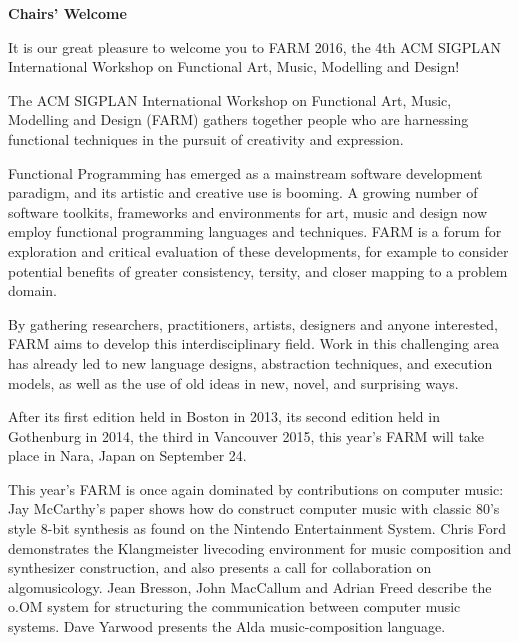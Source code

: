 \documentclass[letter]{sigplanconf}
\begin{document}
\onecolumn

\pagestyle{empty}
\begin{center}
{\bfseries \Huge Chairs' Welcome}
\end{center}

\bigskip
\bigskip


It is our great pleasure to welcome you to FARM 2016, the 4th ACM
SIGPLAN International Workshop on Functional Art, Music, Modelling and
Design!

\medskip

The ACM SIGPLAN International Workshop on Functional Art, Music,
Modelling and Design (FARM) gathers together people who are harnessing
functional techniques in the pursuit of creativity and expression.

\medskip

Functional Programming has emerged as a mainstream software
development paradigm, and its artistic and creative use is booming. A
growing number of software toolkits, frameworks and environments for
art, music and design now employ functional programming languages and
techniques. FARM is a forum for exploration and critical evaluation of
these developments, for example to consider potential benefits of
greater consistency, tersity, and closer mapping to a problem domain.

\medskip

By gathering researchers, practitioners, artists, designers and anyone
interested, FARM aims to develop this interdisciplinary field. Work in
this challenging area has already led to new language designs,
abstraction techniques, and execution models, as well as the use of
old ideas in new, novel, and surprising ways.

\medskip

After its first edition held in Boston in 2013, its second edition held in
Gothenburg in 2014, the third in Vancouver 2015, this year's FARM will
take place in Nara, Japan on September 24.

\medskip

This year's FARM is once again dominated by contributions on computer
music: Jay McCarthy's paper shows how do construct computer music with
classic 80's style 8-bit synthesis as found on the Nintendo
Entertainment System.  Chris Ford demonstrates the Klangmeister
livecoding environment for music composition and synthesizer
construction, and also presents a call for collaboration on
algomusicology.  Jean Bresson, John MacCallum and Adrian Freed
describe the o.OM system for structuring the communication between
computer music systems.  Dave Yarwood presents the Alda
music-composition language.
\end{document}
